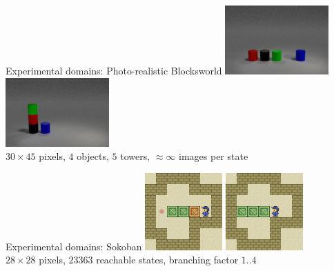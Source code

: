 \documentclass{lecture}
\begin{document}
\begin{frame}{Experimental domains: Photo-realistic Blocksworld}
    \includegraphics[width=.45\textwidth]{img___static___vanilla___blocks___init-highres.png}
    \hfill
    \includegraphics[width=.45\textwidth]{img___static___vanilla___blocks___goal-highres.png}\\
    \vfill
    $30\times 45$ pixels, $4$ objects, $5$ towers, $\approx \infty$ images per state
    \vfill
\end{frame}

\begin{frame}{Experimental domains: Sokoban}
    \includegraphics[width=.45\textwidth]{img___static___vanilla___sokoban___sokoban_init_2_False.png}
    \hfill
    \includegraphics[width=.45\textwidth]{img___static___vanilla___sokoban___sokoban_goal_2_False.png}\\
    \vfill
    $28\times 28$ pixels, $23363$ reachable states, branching factor $1..4$
    \vfill
\end{frame}
\end{document}
